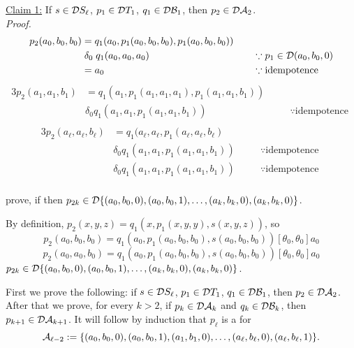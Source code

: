   \noindent \underline{Claim 1:} 
  If 
  $s \in \mathcal{D} S_\ell$,  
  $p_1 \in \mathcal{D} T_1$, 
  $q_1\in \mathcal{D} \mathcal{B}_1$, then $p_2 \in \mathcal{D} \mathcal{A}_2$.\\[5pt]
  \emph{Proof.}
  \begin{alignat*}{3}
  p_2(a_0, b_0, b_0) &= q_1(a_0, p_1(a_0,b_0,b_0), p_1(a_0,b_0,b_0)) &  &\\
  &\mathrel{\delta_0} q_1(a_0, a_0, a_0) & \quad&\because p_1\in \mathcal{D} (a_0, b_0, 0)  \\
  &= a_0 & \quad&\because \text{idempotence }  
  \end{alignat*}
  \begin{alignat*}{3}
  p_2(a_1, a_1, b_1) &= q_1(a_1, p_1(a_1,a_1,a_1), p_1(a_1,a_1,b_1)) &  &\\
  &\mathrel{\delta_0} q_1(a_1, a_1, p_1(a_1, a_1, b_1)) & \quad&\because \text{idempotence }  \\
  \end{alignat*}
  \begin{alignat*}{3}
  p_2(a_\ell, a_\ell, b_\ell) &= q_1(a_\ell, a_\ell, p_1(a_\ell,a_\ell,b_\ell) &  &\\
  &\mathrel{\delta_0} q_1(a_1, a_1, p_1(a_1, a_1, b_1)) & \quad&\because \text{idempotence }  \\
  &\mathrel{\delta_0} q_1(a_1, a_1, p_1(a_1, a_1, b_1)) & \quad&\because \text{idempotence }  \\
  \end{alignat*}
  
  
  
  prove, if
  then
  $p_{2k} \in \mathcal{D} \{(a_0, b_0, 0), (a_0, b_0, 1), \dots, (a_k, b_k, 0), (a_k, b_k, 0)\}$.
  
  By definition,
  $p_2(x,y,z) = q_1(x, p_1(x,y,y), s(x,y,z))$, so 
  \[
  p_2(a_0, b_0, b_0) = q_1(a_0, p_1(a_0,b_0,b_0), s(a_0,b_0,b_0))\mathrel{[\theta_0, \theta_0]}a_0
  \]
  \[
  p_2(a_0, a_0, b_0) = q_1(a_0, p_1(a_0,b_0,b_0), s(a_0,b_0,b_0))\mathrel{[\theta_0, \theta_0]}a_0
  \]
  $p_{2k} \in \mathcal{D} \{(a_0, b_0, 0), (a_0, b_0, 1), \dots, (a_k, b_k, 0), (a_k, b_k, 0)\}$.
  
  First we prove the following: if $s \in \mathcal{D} S_\ell$,  $p_1 \in \mathcal{D} T_1$, $q_1\in \mathcal{D} \mathcal{B}_1$,
  then $p_2 \in \mathcal{D} \mathcal{A}_2$.
  After that we prove, for every $k>2$, if 
  $p_{k} \in \mathcal{D} \mathcal{A}_{k}$ and $q_{k} \in \mathcal{D} \mathcal{B}_k$, then 
  $p_{k+1} \in \mathcal{D} \mathcal{A}_{k+1}$.  It will follow by induction that 
  $p_{\ell}$ is a \ldto for 
  \[
    \mathcal{A}_{\ell-2} :=  \{(a_0, b_0, 0), (a_0, b_0, 1), (a_1,b_1,0), \dots, 
    (a_{\ell}, b_{\ell}, 0), (a_\ell, b_\ell, 1)\}.
  \]
  
